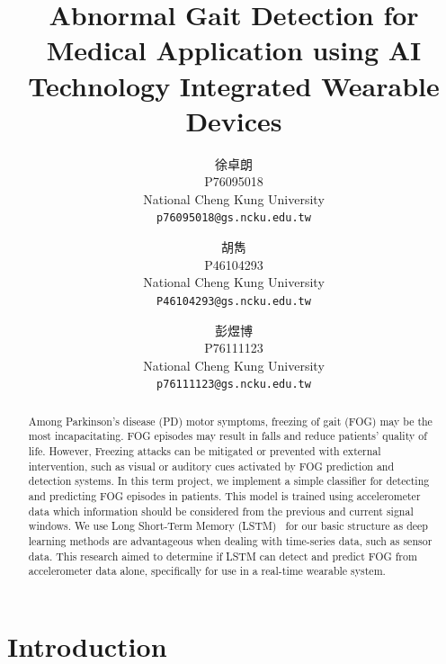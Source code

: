 \documentclass[10pt,twocolumn,letterpaper]{article}
\begin{document}
\title{Abnormal Gait Detection for Medical Application using AI Technology Integrated Wearable Devices}

\author{
    \begin{CJK*}{UTF8}{bkai}
        徐卓朗
    \end{CJK*}
    P76095018\\
    National Cheng Kung University\\
    {\tt\small p76095018@gs.ncku.edu.tw}
    \and
    \begin{CJK*}{UTF8}{bkai}
        胡雋
    \end{CJK*}
    P46104293\\
    National Cheng Kung University\\
    {\tt\small P46104293@gs.ncku.edu.tw}
    \and
    \begin{CJK*}{UTF8}{bkai}
        彭煜博
    \end{CJK*}
    P76111123\\
    National Cheng Kung University\\
    {\tt\small p76111123@gs.ncku.edu.tw}
}
\maketitle

\begin{abstract}
\label{sec:abstract}

    Among Parkinson’s disease (PD) motor symptoms, freezing of gait (FOG) may be the most incapacitating. FOG episodes may result in falls and reduce patients’ quality of life. However, Freezing attacks can be mitigated or prevented with external intervention, such as visual or auditory cues activated by FOG prediction and detection systems.
    In this term project, we implement a simple classifier for detecting and predicting FOG episodes in patients. This model is trained using accelerometer data which information should be considered from the previous and current signal windows. We use Long Short-Term Memory (LSTM)~\cite{10.1162/neco.1997.9.8.1735} for our basic structure as deep learning methods are advantageous when dealing with time-series data, such as sensor data.
    This research aimed to determine if LSTM can detect and predict FOG from accelerometer data alone, specifically for use in a real-time wearable system.

\end{abstract}

\section{Introduction}
\label{sec:intro}
\end{document}
